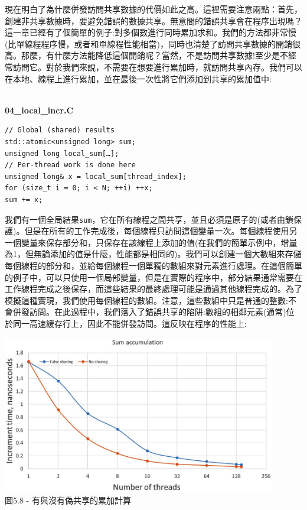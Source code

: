 現在明白了為什麼併發訪問共享數據的代價如此之高。這裡需要注意兩點：首先，創建非共享數據時，要避免錯誤的數據共享。無意間的錯誤共享會在程序出現嗎？這一章已經有了個簡單的例子:對多個數進行同時累加求和。我們的方法都非常慢(比單線程程序慢，或者和單線程性能相當)，同時也清楚了訪問共享數據的開銷很高。那麼，有什麼方法能降低這個開銷呢？當然，不是訪問共享數據!至少是不經常訪問它。對於我們來說，不需要在想要進行累加時，就訪問共享內存。我們可以在本地、線程上進行累加，並在最後一次性將它們添加到共享的累加值中:

\hspace*{\fill} \\ %
\noindent
\textbf{04\_local\_incr.C}
\begin{lstlisting}[style=styleCXX]
// Global (shared) results
std::atomic<unsigned long> sum;
unsigned long local_sum[…];
// Per-thread work is done here
unsigned long& x = local_sum[thread_index];
for (size_t i = 0; i < N; ++i) ++x;
sum += x;
\end{lstlisting}

我們有一個全局結果\texttt{sum}，它在所有線程之間共享，並且必須是原子的(或者由鎖保護)。但是在所有的工作完成後，每個線程只訪問這個變量一次。每個線程使用另一個變量來保存部分和，只保存在該線程上添加的值(在我們的簡單示例中，增量為1，但無論添加的值是什麼，性能都是相同的)。我們可以創建一個大數組來存儲每個線程的部分和，並給每個線程一個單獨的數組來對元素進行處理。在這個簡單的例子中，可以只使用一個局部變量，但是在實際的程序中，部分結果通常需要在工作線程完成之後保存，而這些結果的最終處理可能是通過其他線程完成的。為了模擬這種實現，我們使用每個線程的數組。注意，這些數組中只是普通的整數:不會併發訪問。在此過程中，我們落入了錯誤共享的陷阱:數組的相鄰元素(通常)位於同一高速緩存行上，因此不能併發訪問。這反映在程序的性能上:

\begin{center}
\includegraphics[width=0.9\textwidth]{content/1/chapter5/images/8.jpg}\\
圖5.8 - 有與沒有偽共享的累加計算
\end{center}

